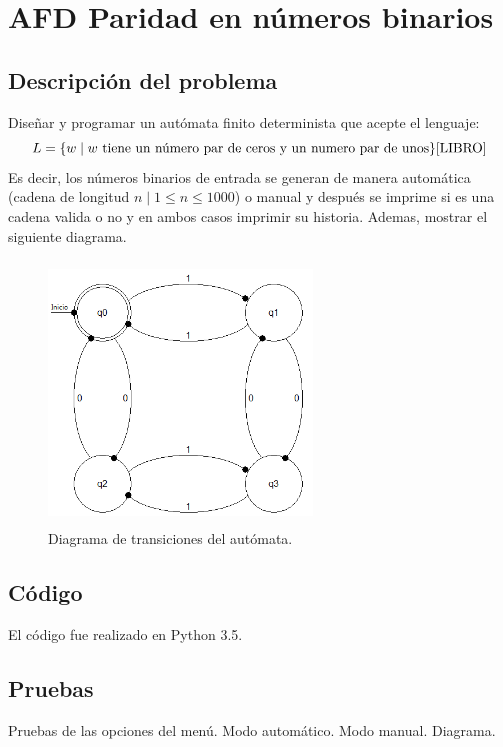 \section{AFD Paridad en números binarios}
	\subsection{Descripción del problema}
	Diseñar y programar un autómata finito determinista que acepte el lenguaje:
	\[ L = \lbrace w \mid w \text{ tiene un número par de ceros y un numero par de unos} \rbrace \text{\cite{LIBRO}}\] 
	Es decir, los números binarios de entrada se generan de manera automática (cadena de longitud $n \mid 1\leq n \leq 1000$) o manual y después se imprime si es una cadena valida o no y en ambos casos imprimir su historia. Ademas, mostrar el siguiente diagrama.
	\begin{figure}[ht]
		\begin{center}
			\includegraphics[width=7cm, height=7cm]{img/paridad.png}
			\caption{Diagrama de transiciones del autómata. \cite{LIBRO}}
			\label{fig:diagrama2}
		\end{center}
	\end{figure}
	\subsection{Código}
	El código fue realizado en Python 3.5.
	\subsection{Pruebas}
	Pruebas de las opciones del menú.
	{\large Modo automático.}
	{\large Modo manual.}
	{\large Diagrama.}